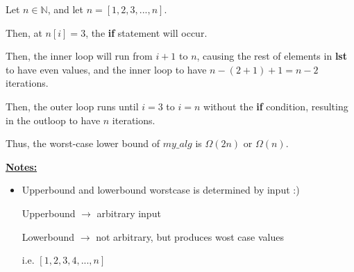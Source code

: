 \documentclass[12pt]{article}
\begin{document}
\begin{enumerate}[1.]
\begin{enumerate}[a)]
        \bigskip

        Let $n \in \mathbb{N}$, and let $n = [1,2,3,...,n]$.

        \bigskip

        Then, at $n[i] = 3$, the \textbf{if} statement will occur.

        \bigskip

        Then, the inner loop will run from $i + 1$ to $n$, causing the rest of elements
        in \textbf{lst} to have even values, and the inner loop to have $n - (2+1) + 1 = n - 2$ iterations.

        \bigskip

        Then, the outer loop runs until $i = 3$ to $i = n$ without the \textbf{if} condition,
        resulting in the outloop to have $n$ iterations.

        \bigskip
        Thus, the worst-case lower bound of \textbf{$my\_alg$} is $\Omega(2n)$ or $\Omega(n)$.

        \bigskip

        \underline{\textbf{Notes:}}

        \bigskip

        \begin{itemize}
            \item Upperbound and lowerbound worstcase is determined by input :)

            \bigskip

            Upperbound $\to$ arbitrary input

            \bigskip

            Lowerbound $\to$ not arbitrary, but produces wost case values

            \bigskip

            i.e. $[1,2,3,4,...,n]$
        \end{itemize}

    \end{enumerate}

    \bigskip

\end{enumerate}
\end{document}
